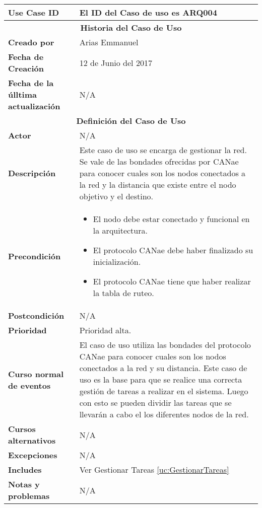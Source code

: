 \begin{longtable}{|p{5cm}|p{8cm}|}
  \hline
  \textbf{Use Case ID} & El ID del Caso de uso es ARQ004 \\ \hline
  \multicolumn{2}{|c|}{\Large\textbf{Historia del Caso de Uso}} \\ \hline
  \textbf{Creado por} & Arias Emmanuel \\ \hline
  \textbf{Fecha de Creación} & 12 de Junio del 2017 \\ \hline
  \textbf{Fecha de la úlltima actualización} & N/A \\ \hline
  \multicolumn{2}{|c|}{\Large\textbf{Definición del Caso de Uso}} \\ \hline
  \textbf{Actor} & N/A \\ \hline
  \textbf{Descripción} & Este caso de uso se encarga de gestionar la red. Se vale de las
bondades ofrecidas por CANae para conocer cuales son los nodos
conectados a la red y la distancia que existe entre el nodo
objetivo y el destino. \\ \hline
  \textbf{Precondición} & \begin{itemize}
\item El nodo debe estar conectado y funcional en la arquitectura.
\item El protocolo CANae debe haber finalizado su inicialización.
\item El protocolo CANae tiene que haber realizar la tabla de ruteo.
\end{itemize} \\ \hline
  \textbf{Postcondición}  & N/A \\ \hline
  \textbf{Prioridad} & Prioridad alta. \\ \hline
  \textbf{Curso normal de eventos} & El caso de uso utiliza las bondades del protocolo CANae para conocer
cuales son los nodos conectados a la red y su distancia. Este caso
de uso es la base para que se realice una correcta gestión de tareas
a realizar en el sistema. Luego con esto se pueden dividir las tareas que
se llevarán a cabo el los diferentes nodos de la red.  \\ \hline
\textbf{Cursos alternativos} & N/A \\ \hline
\textbf{Excepciones} & N/A \\ \hline
\textbf{Includes} & Ver Gestionar Tareas \ref{uc:GestionarTareas} \\ \hline
\textbf{Notas y problemas} & N/A \\ \hline
\end{longtable}

